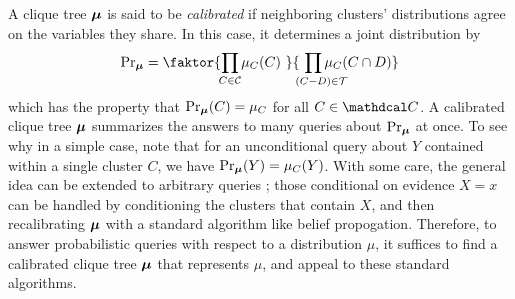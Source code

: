 \documentclass{article}
\newcommand\discard[1]{}
\begin{document}
A clique tree
$\boldsymbol\mu$ 
is said to be \emph{calibrated} if neighboring clusters' distributions agree on the variables 
they share.
In this case, 
it determines a joint distribution by
\vspace{-0.5ex}
\begin{equation}
    \Pr\nolimits_{\bmu} = \faktor
        {\prod_{\mathclap{C \in \cal C}} \mu_C(C)~}
        {~\prod_{\mathclap{(C{-}D) \mathrlap{\in \cal T}}} \mu_{C}(C \cap D)}
    \label{eq:cliquedist}
    \vspace{-0.51ex}
\end{equation}
which has the property that $\Pr_{\boldsymbol\mu}(C) = \mu_C$ for 
all
$C \in \C$.
A calibrated clique tree $\boldsymbol\mu$ summarizes the answers to 
    many 
    queries about $\Pr_{\boldsymbol\mu}$ at once. 
To see why
in a simple case, note that 
for an unconditional query about $Y$ contained within a single cluster $C$, we have
$\Pr_{\boldsymbol\mu}(Y) = \mu_C(Y)$.
\discard{%
    Note also that if $\C = \{ \X \}$ just contains one big cluster, 
    a clique tree is an explicit joint distribution, reducing queries to summation.}%
With some care, the general idea can be extended to arbitrary queries 
    \parencite[see][\S 10.3.3]{koller2009probabilistic};
    those conditional on evidence $X{=}x$ can be handled
    by conditioning the clusters that contain $X$,
    and then recalibrating $\boldsymbol\mu$ with 
    a standard algorithm like belief propogation.
Therefore, to answer probabilistic queries with respect to a distribution $\mu$, it suffices to find a calibrated clique tree $\boldsymbol\mu$ that represents $\mu$, and appeal to these standard algorithms.
\end{document}
